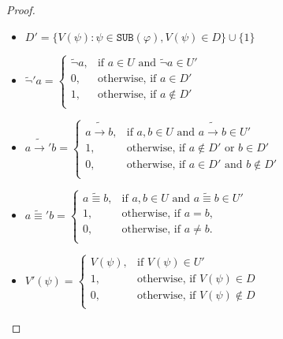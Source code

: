 \documentclass{article}
\theoremstyle{definition}
\theoremstyle{definition}
\theoremstyle{definition}
\theoremstyle{definition}
\theoremstyle{definition}
\newcommand*{\id}{\equiv}
\newcommand*{\ra}{\rightarrow}
\newcommand*{\SUB}{\texttt{SUB}}
\begin{document}
\begin{proof}
\begin{itemize}
        \item $D' = \{V(\psi) : \psi \in \SUB(\varphi), V(\psi) \in D\} \cup \{1\}$
        \item $
                  \tilde{\lnot}'a = \begin{cases}
                      \tilde{\lnot}a , & \text{if } a \in U \text{ and } \tilde{\lnot}a \in U' \\
                      0,               & \text{otherwise, if } a \in D'                        \\
                      1,               & \text{otherwise, if } a \not \in D'                   \\
                  \end{cases}
              $
        \item $
                  a\tilde{\ra}'b = \begin{cases}
                      a\tilde{\ra}b , & \text{if } a, b \in U \text{ and } a \tilde{\ra} b \in U' \\
                      1,              & \text{otherwise, if } a \not \in D' \text{ or } b \in D'  \\
                      0,              & \text{otherwise, if } a \in D' \text{ and } b \not \in D' \\
                  \end{cases}
              $
        \item $
                  a\tilde{\id}'b = \begin{cases}
                      a\tilde{\id}b , & \text{if } a,b \in U \text{ and } a \tilde{\id} b \in U' \\
                      1,              & \text{otherwise, if } a = b,                             \\
                      0,              & \text{otherwise, if }a \not = b.                         \\
                  \end{cases}
              $
        \item $V'(\psi) = \begin{cases}
                      V(\psi) , & \text{if } V(\psi) \in U'                \\
                      1,        & \text{otherwise, if } V(\psi) \in D      \\
                      0,        & \text{otherwise, if } V(\psi) \not \in D \\
                  \end{cases}$

\end{itemize}
\end{proof}
\end{document}
